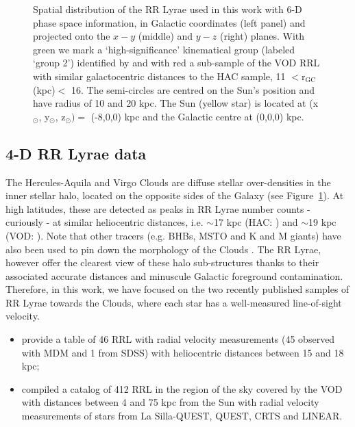 \documentclass[fleqn,usenatbib]{mnras}
\begin{document}
\begin{figure}
	\vspace{-0.45cm}
    \caption{Spatial distribution of the RR Lyrae used in this work with 6-D phase space information, in Galactic coordinates (left panel) and projected onto the $x-y$ (middle) and $y-z$ (right) planes. With green we mark a `high-significance' kinematical group (labeled `group 2') identified by \citet{Vivas2016} and with red a sub-sample of the VOD RRL with similar galactocentric distances to the HAC sample, 11 $<\mathrm{r_{GC}}$ (kpc)$<$ 16. The semi-circles are centred on the Sun's position and have radius of 10 and 20 kpc. The Sun (yellow star) is located at (x$_{\odot}$, y$_{\odot}$, z$_{\odot})= $ (-8,0,0) kpc and the Galactic centre at (0,0,0) kpc.  }
    \label{fig:lb}
\end{figure}
%
%
\subsection{4-D RR Lyrae data}
%
The Hercules-Aquila and Virgo Clouds are diffuse stellar
over-densities in the inner stellar halo, located on the opposite
sides of the Galaxy (see Figure~\ref{fig:lb}). At high latitudes,
these are detected as peaks in RR Lyrae number counts - curiously - at
similar heliocentric distances, i.e. $\sim$17 kpc (HAC:
\citealt{Wa09,Simion2014}) and $\sim$19 kpc (VOD: \citealt{Vivas2006,
  Duffau2014, Vivas2016}). Note that other tracers (e.g. BHBs, MSTO
and K and M giants) have also been used to pin down the morphology of
the Clouds \citep[see
  e.g.][]{Be07,Juric2008,Sharma2010,Bonaca2012,Conroy2018}. The RR
Lyrae, however offer the clearest view of these halo sub-structures
thanks to their associated accurate distances and minuscule Galactic
foreground contamination. Therefore, in this work, we have focused on
the two recently published samples of RR Lyrae towards the Clouds,
where each star has a well-measured line-of-sight velocity.
%
\begin{itemize}
\item \citet{Simion2018} provide a table of 46 RRL with radial
  velocity measurements (45 observed with MDM and 1 from SDSS) with
  heliocentric distances between 15 and 18 kpc;
\item \cite{Vivas2016} compiled a catalog of 412 RRL in the region of
  the sky covered by the VOD with distances between 4 and 75 kpc from
  the Sun with radial velocity measurements of stars from La
  Silla-QUEST, QUEST, CRTS and LINEAR.
\end{itemize}
%
%
\end{document}
